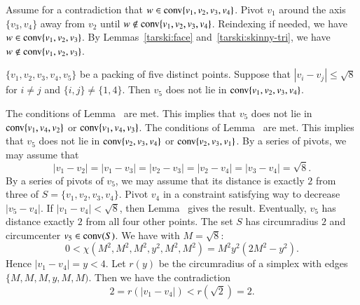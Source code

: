 \begin{tarskidata}
\begin{tarski}
\begin{proved}
Assume for a contradiction that $w\in{\operatorname{conv}}\{v_1,v_2,v_3,v_4\}$.
Pivot $v_1$ around the axis $\{v_3,v_4\}$ away from $v_2$ until $w\not\in{\operatorname{conv}}\{v_1,v_2,v_3,v_4\}$.
Reindexing if needed, we have $w\in{\operatorname{conv}}\{v_1,v_2,v_3\}$.
By Lemmas~\ref{tarski:face} and~\ref{tarski:skinny-tri}, we have $w\not\in{\operatorname{conv}}\{v_1,v_2,v_3\}$.
%
\swallowed\end{proved}
\end{tarski}

\begin{tarski}

\begin{lemma}
$\{v_1,v_2,v_3,v_4,v_5\}$ be a packing of
five distinct points.  Suppose that $|v_i-v_j|\le
\sqrt8$ for $i\ne j$ and $\{i,j\}\ne\{1,4\}$. Then $v_5$ does not lie
in ${\operatorname{conv}}\{v_1,v_2,v_3,v_4\}$.
\end{lemma}


\begin{proved}
The conditions of Lemma~ are met. This implies
that $v_5$ does not lie in ${\operatorname{conv}}\{v_1,v_4,v_2\}$ or
	${\operatorname{conv}}\{v_1,v_4,v_3\}$.
The conditions of Lemma~ are met.  This implies that
$v_5$ does not lie in ${\operatorname{conv}}\{v_2,v_3,v_4\}$ or
	${\operatorname{conv}}\{v_2,v_3,v_1\}$.
By a series of pivots, we may assume that
	$$|v_1-v_2|=|v_1-v_3|=|v_2-v_3|=|v_2-v_4|=|v_3-v_4|=\sqrt8.$$
By a series of pivots of $v_5$, we may assume that its distance is exactly
$2$ from three of $S=\{v_1,v_2,v_3,v_4\}$.  
Pivot $v_4$ in a constraint satisfying way to decrease $|v_5-v_4|$.
If $|v_1-v_4|<\sqrt8$, then Lemma~ %
gives the
result.
Eventually, $v_5$ has distance exactly $2$ from all four other points.
The set $S$ has circumradius $2$ and circumcenter $v_5\in{\operatorname{conv}}(S)$.  
	We have with $M=\sqrt8$:
	$$0 < \chi(M^2,M^2,M^2,y^2,M^2,M^2)= M^2 y^2 (2M^2 - y^2).$$
Hence $|v_1-v_4|=y < 4$.
Let $r(y)$ be the circumradius of a simplex with edges $\{M,M,M,y,M,M)$.
Then we have the contradiction
	$$2 = r(|v_1-v_4|) < r(\sqrt2) = 2.$$
\swallowed\end{proved}
\end{tarski}






\end{tarskidata}
